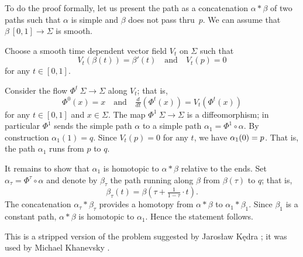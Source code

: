 To do the proof formally,
let us present the path as a concatenation $\alpha*\beta$ of two paths  such that $\alpha$ is simple
and $\beta$ does not pass thru~$p$.
We can assume that $\beta\:[0,1]\to \Sigma$ is smooth.

Choose a smooth time dependent vector field $V_t$ on $\Sigma$ such that
\[V_t(\beta(t))=\beta'(t)\quad\text{and}\quad V_t(p)=0\]
for any $t\in[0,1]$. 

Consider the flow $\Phi^t\:\Sigma\to \Sigma$ along $V_t$;
that is,
\[\Phi^0(x)=x\quad\text{and}\quad \tfrac{d}{dt}(\Phi^t(x))=V_t(\Phi^t(x))\]
for any $t\in[0,1]$ and $x\in \Sigma$.
The map $\Phi^1\:\Sigma\to \Sigma$ is a diffeomorphism;
in particular $\Phi^1$ sends the simple path $\alpha$ to a simple path $\alpha_1=\Phi^1\circ\alpha$.
By construction $\alpha_1(1)=q$. 
Since $V_t(p)=0$ for any $t$, we have $\alpha_1(0)\z=p$.
That is, the path $\alpha_1$ runs from $p$ to $q$.

It remains to show that $\alpha_1$ is homotopic to $\alpha*\beta$ relative to the ends.
Set $\alpha_\tau=\Phi^\tau\circ\alpha$ and denote by  $\beta_\tau$ the path running along $\beta$ from $\beta(\tau)$ to $q$;
that is, 
\[\beta_\tau(t)=\beta(\tau+\tfrac1{1-\tau}\cdot t).\]
The concatenation $\alpha_\tau*\beta_\tau$ provides a homotopy from $\alpha*\beta$ to $\alpha_1*\beta_1$. 
Since $\beta_1$ is a constant path, $\alpha*\beta$ is homotopic to $\alpha_1$.
Hence the statement follows.
\qeds

This is a stripped version of the problem suggested by Jaros{\l}aw K\k{e}dra \cite{One-step}; 
it was used by Michael Khanevsky \cite[Lemma 3 in][]{khanevsky}.
